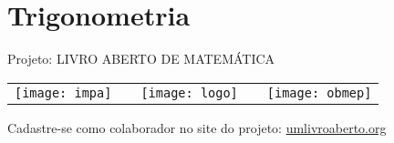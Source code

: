 
\ifnum{}
\renewcommand\chapterillustration{./abertura-trigonometria}
\else
\renewcommand\chapterillustration{./abertura-trigonometria-professor}
\fi


\makeatletter
\ifnum{}
\else
\renewcommand*{\toclevel@section}{1}
\renewcommand*{\toclevel@subsection}{4}
\renewcommand*{\toclevel@paragraph}{5}
\renewcommand*{\toclevel@subparagraph}{6}

\renewcommand*{\toclevel@exploresec}{2}
\renewcommand*{\toclevel@practicesec}{2}
\renewcommand*{\toclevel@arrangesec}{2}
\renewcommand*{\toclevel@knowsec}{2}
\renewcommand*{\toclevel@exercisesec}{1}

\setcounter{tocdepth}{2}
\fi
\makeatother

\renewcommand\chapterwhat{Trigonometria em triângulos retângulos e em triângulos não retângulos,  leis dos senos e 
cossenos.}
\renewcommand\chapterbecause{As relações e resultados provenientes da Trigonometria são fundamentais para resolver problemas em diversos contextos, apesar de  muitas vezes não serem utilizados explicitamente no nosso cotidiano. Aplicações relacionadas à Trigonometria podem ser encontradas em diversas áreas, como Física, Engenharia, Arquitetura, Astronomia e Topografia.} 
\chapter{Trigonometria}
\label{trigo-chap}

\mbox{}\thispagestyle{empty}\clearpage

\thispagestyle{empty}

\begin{center}
Projeto: LIVRO ABERTO DE MATEMÁTICA

\noindent \begin{tabular}{lcccr}
\texttt{[image: impa]}& \quad\quad& \texttt{[image: logo]} & \quad\quad& \texttt{[image: obmep]} 
\end{tabular}
\end{center}

\vspace*{.3cm}

Cadastre-se como colaborador no site do projeto: \url{umlivroaberto.org}




